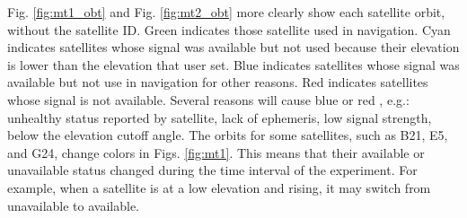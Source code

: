 \documentclass[letterpaper, 10 pt,onecolumn]{article}
\begin{document}
	Fig. \ref{fig:mt1_obt} and Fig. \ref{fig:mt2_obt} more clearly show each satellite orbit, without the satellite ID. 
	Green indicates those satellite  used in navigation. 
	Cyan indicates satellites whose signal was available but not used because their elevation is \red lower than the elevation that user set. \black
	Blue indicates satellites whose signal was available but not use in navigation for other reasons. 
	Red  indicates satellites whose signal is not available. 
	Several reasons will cause blue or red \cite{ucenter}, e.g.: unhealthy status reported by satellite, lack of ephemeris, low signal strength, below the elevation cutoff angle. 
	The orbits for some satellites, such as B21, E5, and G24, change colors in Figs. \ref{fig:mt1}.
	This means that their available or unavailable status changed during the time interval of the experiment.
	For example, when a satellite is at a low elevation and rising, it may switch from unavailable to available. 
\end{document}

